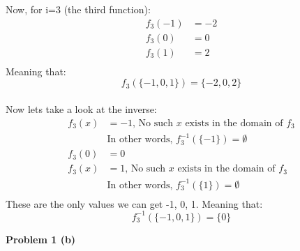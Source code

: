 \documentclass{article}
\begin{document}
Now, for i=3 (the third function):
\begin{align*}
   f_3(-1) &= -2 \\
   f_3(0)  &= 0 \\
   f_3(1)  &= 2 \\
\end{align*}
Meaning that:
\[
   f_3(\{-1, 0, 1\}) = \{-2, 0, 2\}
\]
\\
Now lets take a look at the inverse:
\begin{align*}
   f_3(x) & = -1 \text{, No such $x$ exists in the domain of $f_3$} \\
          & \text{In other words, } f_3^{-1}(\{-1\}) = \emptyset    \\
   f_3(0) & = 0                                                     \\
   f_3(x) & = 1 \text{, No such $x$ exists in the domain of $f_3$}  \\
          & \text{In other words, } f_3^{-1}(\{1\}) = \emptyset     \\
\end{align*}
These are the only values we can get -1, 0, 1. Meaning that:
\[
   f_3^{-1}(\{-1, 0, 1\}) = \{0\}
\]


\begin{flushleft}
   \textbf{\Large Problem 1 (b)}
\end{flushleft}
\end{document}
